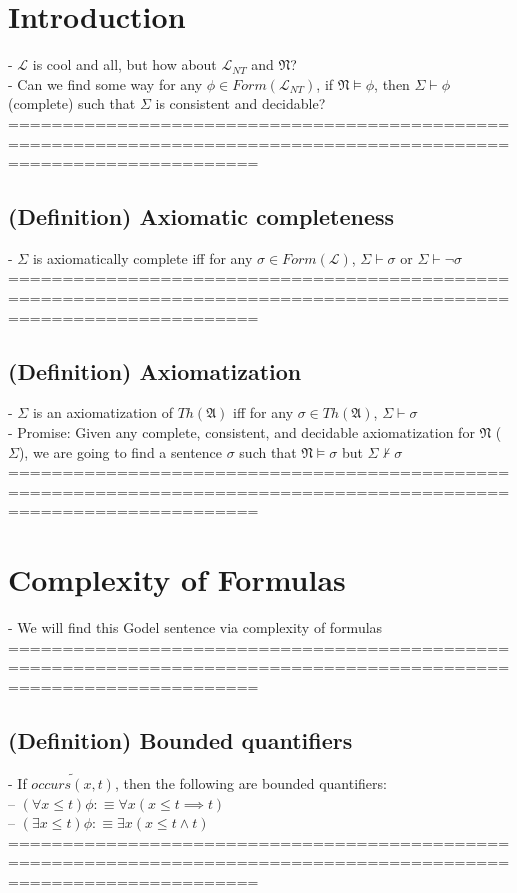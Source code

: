 \documentclass{book}
\newcommand{\is}{:\equiv}
\newcommand{\pnot}[1]{\widetilde{#1}}
\newcommand{\inot}{\not}
\newcommand{\occurs}[2]{occurs(#1, #2)}
\begin{document}
\section{Introduction}
	- $\mathcal{L}$ is cool and all, but how about $\mathcal{L}_{NT}$ and $\mathfrak{N}$? \\
	- Can we find some way for any $\phi \in Form(\mathcal{L}_{NT})$, if $\mathfrak{N} \vDash \phi$, then $\Sigma \vdash \phi$ (complete) such that $\Sigma$ is consistent and decidable? \\
	===================================================================================================================
\subsection{(Definition) Axiomatic completeness} %
	- $\Sigma$ is axiomatically complete iff for any $\sigma \in Form(\mathcal{L})$, $\Sigma \vdash \sigma$ or $\Sigma \vdash \lnot \sigma$ \\
	===================================================================================================================
\subsection{(Definition) Axiomatization} %
	- $\Sigma$ is an axiomatization of $Th(\mathfrak{A})$ iff for any $\sigma \in Th(\mathfrak{A})$, $\Sigma \vdash \sigma$ \\
	- Promise: Given any complete, consistent, and decidable axiomatization for $\mathfrak{N}$ ($\Sigma$), we are going to find a sentence $\sigma$ such that $\mathfrak{N} \vDash \sigma$ but $\Sigma \inot \vdash \sigma$ \\
	===================================================================================================================

\section{Complexity of Formulas}
	- We will find this Godel sentence via complexity of formulas \\
	===================================================================================================================
\subsection{(Definition) Bounded quantifiers} %
	- If $\pnot{\occurs{x}{t}}$, then the following are bounded quantifiers: \\
		-- $(\forall x \leq t) \phi \is \forall x (x \leq t \implies t)$ \\
		-- $(\exists x \leq t) \phi \is \exists x (x \leq t \land t)$ \\
	===================================================================================================================
\end{document}
